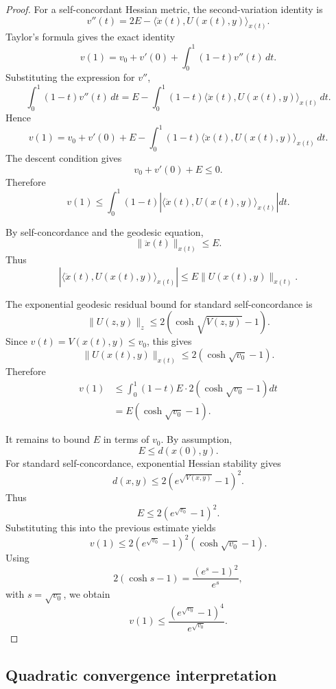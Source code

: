 \documentclass[11pt]{article}
\begin{document}
\begin{proof}
For a self-concordant Hessian metric, the second-variation identity is
\[
    v''(t)
    =
    2E-\langle \ddot x(t),U(x(t),y)\rangle_{x(t)}.
\]
Taylor's formula gives the exact identity
\[
    v(1)
    =
    v_0+v'(0)+\int_0^1(1-t)v''(t)\,dt.
\]
Substituting the expression for \(v''\),
\[
    \int_0^1(1-t)v''(t)\,dt
    =
    E-\int_0^1(1-t)
    \langle \ddot x(t),U(x(t),y)\rangle_{x(t)}\,dt.
\]
Hence
\[
    v(1)
    =
    v_0+v'(0)+E
    -
    \int_0^1(1-t)
    \langle \ddot x(t),U(x(t),y)\rangle_{x(t)}\,dt.
\]
The descent condition gives
\[
    v_0+v'(0)+E\le 0.
\]
Therefore
\[
    v(1)
    \le
    \int_0^1(1-t)
    \left|
    \langle \ddot x(t),U(x(t),y)\rangle_{x(t)}
    \right|dt.
\]

By self-concordance and the geodesic equation,
\[
    \|\ddot x(t)\|_{x(t)}\le E.
\]
Thus
\[
    \left|
    \langle \ddot x(t),U(x(t),y)\rangle_{x(t)}
    \right|
    \le
    E\|U(x(t),y)\|_{x(t)}.
\]

The exponential geodesic residual bound for standard self-concordance is
\[
    \|U(z,y)\|_z
    \le
    2\left(\cosh\sqrt{V(z,y)}-1\right).
\]
Since \(v(t)=V(x(t),y)\le v_0\), this gives
\[
    \|U(x(t),y)\|_{x(t)}
    \le
    2\left(\cosh\sqrt{v_0}-1\right).
\]
Therefore
\[
\begin{aligned}
    v(1)
    &\le
    \int_0^1(1-t)
    E\cdot
    2\left(\cosh\sqrt{v_0}-1\right)dt  \\
    &=
    E\left(\cosh\sqrt{v_0}-1\right).
\end{aligned}
\]

It remains to bound \(E\) in terms of \(v_0\). By assumption,
\[
    E\le d(x(0),y).
\]
For standard self-concordance, exponential Hessian stability gives
\[
    d(x,y)
    \le
    2\left(e^{\sqrt{V(x,y)}}-1\right)^2.
\]
Thus
\[
    E
    \le
    2\left(e^{\sqrt{v_0}}-1\right)^2.
\]
Substituting this into the previous estimate yields
\[
    v(1)
    \le
    2\left(e^{\sqrt{v_0}}-1\right)^2
    \left(\cosh\sqrt{v_0}-1\right).
\]
Using
\[
    2(\cosh s-1)
    =
    \frac{(e^s-1)^2}{e^s},
\]
with \(s=\sqrt{v_0}\), we obtain
\[
    v(1)
    \le
    \frac{(e^{\sqrt{v_0}}-1)^4}{e^{\sqrt{v_0}}}.
\]
\end{proof}






\subsection*{Quadratic convergence interpretation}
\end{document}
